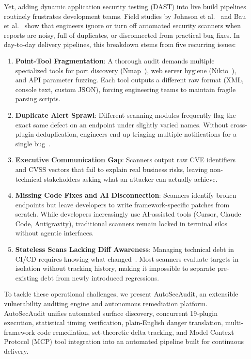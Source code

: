 \documentclass[conference]{IEEEtran}
\begin{document}
Yet, adding dynamic application security testing (DAST) into live build pipelines routinely frustrates development teams. Field studies by Johnson et al.~\cite{johnson2013developers} and Bau et al.~\cite{bau2010state} show that engineers ignore or turn off automated security scanners when reports are noisy, full of duplicates, or disconnected from practical bug fixes. In day-to-day delivery pipelines, this breakdown stems from five recurring issues:
\begin{enumerate}
    \item \textbf{Point-Tool Fragmentation}: A thorough audit demands multiple specialized tools for port discovery (Nmap~\cite{nmap}), web server hygiene (Nikto~\cite{nikto}), and API parameter fuzzing. Each tool outputs a different raw format (XML, console text, custom JSON), forcing engineering teams to maintain fragile parsing scripts.
    \item \textbf{Duplicate Alert Sprawl}: Different scanning modules frequently flag the exact same defect on an endpoint under slightly varied names. Without cross-plugin deduplication, engineers end up triaging multiple notifications for a single bug~\cite{johnson2013developers}.
    \item \textbf{Executive Communication Gap}: Scanners output raw CVE identifiers and CVSS vectors that fail to explain real business risks, leaving non-technical stakeholders asking what an attacker can actually achieve.
    \item \textbf{Missing Code Fixes and AI Disconnection}: Scanners identify broken endpoints but leave developers to write framework-specific patches from scratch. While developers increasingly use AI-assisted tools (Cursor, Claude Code, Antigravity), traditional scanners remain locked in terminal silos without agentic interfaces.
    \item \textbf{Stateless Scans Lacking Diff Awareness}: Managing technical debt in CI/CD requires knowing what changed~\cite{vassallo2020continuous}. Most scanners evaluate targets in isolation without tracking history, making it impossible to separate pre-existing debt from newly introduced regressions.
\end{enumerate}

To tackle these operational challenges, we present AutoSecAudit, an extensible vulnerability auditing engine and autonomous remediation platform. AutoSecAudit unifies automated surface discovery, concurrent 19-plugin execution, statistical timing verification, plain-English danger translation, multi-framework code remediation, set-theoretic delta tracking, and Model Context Protocol (MCP) tool integration into an automated pipeline built for continuous delivery.
\end{document}
